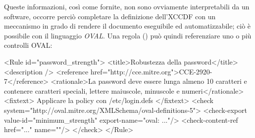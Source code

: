 \documentclass[../main.tex]{subfiles}
\begin{document}
Queste informazioni, così come fornite, non sono ovviamente interpretabili da un software, occorre perciò completare la definizione dell'XCCDF con un meccanismo in grado di rendere il documento eseguibile ed automatizzabile; ciò è possibile con il linguaggio \textit{OVAL}.
Una regola () può quindi referenziare uno o più controlli OVAL:
\begin{xml}
<Rule id="password_strength">
    <title>Robustezza della password</title>
    <description />
    <reference href="http://cce.mitre.org">CCE-2920-7</reference>
    <rationale>La password deve essere lunga almeno 10 caratteri e contenere caratteri speciali, lettere maiuscole, minuscole e numeri</rationale>
    <fixtext>
        Applicare la policy con /etc/login.defs 
    </fixtext>
    <check system="http://oval.mitre.org/XMLSchema/oval-definitions-5">
        <check-export value-id="minimum_strength" export-name="oval: ..."/>
        <check-content-ref href="..." name=""/>
    </check>
</Rule>
\end{xml}
\end{document}
